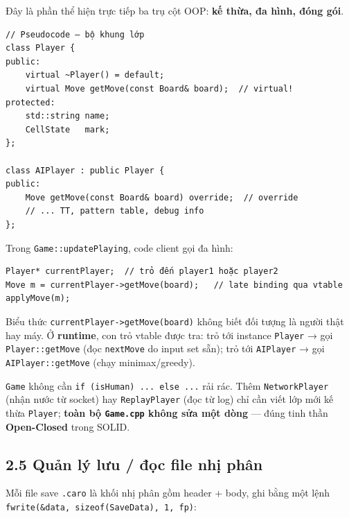 \documentclass[11pt,a4paper]{article}
\begin{document}
Đây là phần thể hiện trực tiếp ba trụ cột OOP: \textbf{kế thừa, đa hình, đóng gói}.

\begin{verbatim}
// Pseudocode — bộ khung lớp
class Player {
public:
    virtual ~Player() = default;
    virtual Move getMove(const Board& board);  // virtual!
protected:
    std::string name;
    CellState   mark;
};

class AIPlayer : public Player {
public:
    Move getMove(const Board& board) override;  // override
    // ... TT, pattern table, debug info
};
\end{verbatim}

Trong \texttt{Game::updatePlaying}, code client gọi đa hình:

\begin{verbatim}
Player* currentPlayer;  // trỏ đến player1 hoặc player2
Move m = currentPlayer->getMove(board);   // late binding qua vtable
applyMove(m);
\end{verbatim}

Biểu thức \texttt{currentPlayer->getMove(board)} không biết đối tượng là người thật hay máy. Ở \textbf{runtime}, con trỏ vtable được tra: trỏ tới instance \texttt{Player} → gọi \texttt{Player::getMove} (đọc \texttt{nextMove} do input set sẵn); trỏ tới \texttt{AIPlayer} → gọi \texttt{AIPlayer::getMove} (chạy minimax/greedy).

\texttt{Game} không cần \texttt{if (isHuman) ... else ...} rải rác. Thêm \texttt{NetworkPlayer} (nhận nước từ socket) hay \texttt{ReplayPlayer} (đọc từ log) chỉ cần viết lớp mới kế thừa \texttt{Player}; \textbf{toàn bộ \texttt{Game.cpp} không sửa một dòng} — đúng tinh thần \textbf{Open-Closed} trong SOLID.
\subsection{2.5 Quản lý lưu / đọc file nhị phân}
\label{sec:org4e7a6bc}

Mỗi file save \texttt{.caro} là khối nhị phân gồm header + body, ghi bằng một lệnh \texttt{fwrite(\&data, sizeof(SaveData), 1, fp)}:
\end{document}
